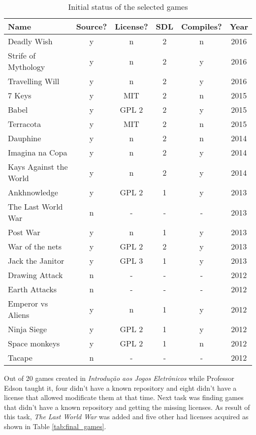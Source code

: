 \begin{table}[h!]
\centering
\caption{Initial status of the selected games}
\label{tab:first_games}
\begin{tabular}{lccccc}
\toprule
\textbf{Name} & \textbf{Source?} & \textbf{License?} & \textbf{SDL} & \textbf{Compiles?} & \textbf{Year}\\
\midrule
Deadly Wish & y & n & 2 & n & 2016 \\
Strife of Mythology & y & n & 2 & y & 2016 \\
Travelling Will & y & n & 2 & y & 2016 \\
7 Keys & y & MIT & 2 & n & 2015 \\
Babel & y & GPL 2 & 2 & y & 2015 \\
Terracota & y & MIT & 2 & n & 2015 \\
Dauphine & y & n & 2 & n & 2014 \\
Imagina na Copa & y & n & 2 & y & 2014 \\
Kays Against the World & y & n & 2 & y & 2014 \\
Ankhnowledge & y & GPL 2 & 1 & y & 2013 \\
The Last World War & n & - & - & - & 2013 \\
Post War & y & n & 1 & y & 2013 \\
War of the nets & y & GPL 2 & 2 & y & 2013 \\
Jack the Janitor & y & GPL 3 & 1 & y & 2013 \\
Drawing Attack & n & - & - & - & 2012 \\
Earth Attacks & n & - & - & - & 2012 \\
Emperor vs Aliens & y & n & 1 & y & 2012 \\
Ninja Siege & y & GPL 2 & 1 & y & 2012 \\
Space monkeys & y & GPL 2 & 1 & n & 2012 \\
Tacape & n & - & - & - & 2012 \\
\bottomrule
\end{tabular}
\end{table}

Out of 20 games created in \textit{Introdu\c{c}\~ao aos Jogos Eletr\^onicos} while Professor Edson taught it, four didn't have a known repository and eight didn't have a license that allowed modificate them at that time. Next task was finding games that didn't have a known repository and getting the missing licenses. As result of this task, \textit{The Last World War} was added and five other had licenses acquired as shown in Table \ref{tab:final_games}.

